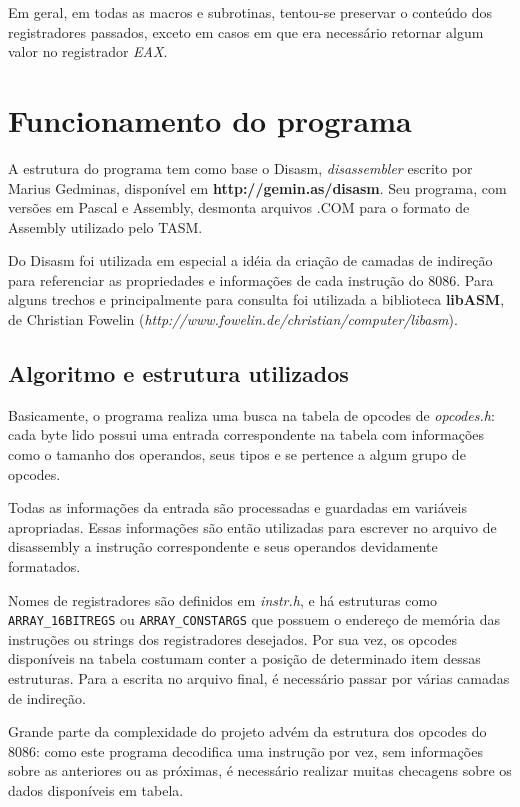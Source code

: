 \documentclass{article}
\begin{document}
Em geral, em todas as macros e subrotinas, tentou-se preservar o conteúdo dos registradores passados, exceto em casos em que era necessário retornar algum valor no registrador \textit{EAX}.


\section{Funcionamento do programa}
A estrutura do programa tem como base o Disasm, \textit{disassembler} escrito por Marius Gedminas, disponível em \textbf{http://gemin.as/disasm}. Seu programa, com versões em Pascal e Assembly, desmonta arquivos .COM para o formato de Assembly utilizado pelo TASM.

Do Disasm foi utilizada em especial a idéia da criação de camadas de indireção para referenciar as propriedades e informações de cada instrução do 8086. Para alguns trechos e principalmente para consulta foi utilizada a biblioteca \textbf{libASM}, de Christian Fowelin (\textit{http://www.fowelin.de/christian/computer/libasm}).

\subsection{Algoritmo e estrutura utilizados}
Basicamente, o programa realiza uma busca na tabela de opcodes de \textit{opcodes.h}: cada byte lido possui uma entrada correspondente na tabela com informações como o tamanho dos operandos, seus tipos e se pertence a algum grupo de opcodes.

Todas as informações da entrada são processadas e guardadas em variáveis apropriadas. Essas informações são então utilizadas para escrever no arquivo de disassembly a instrução correspondente e seus operandos devidamente formatados.

Nomes de registradores são definidos em \textit{instr.h}, e há estruturas como \texttt{ARRAY\_16BITREGS} ou \texttt{ARRAY\_CONSTARGS} que possuem o endereço de memória das instruções ou strings dos registradores desejados. Por sua vez, os opcodes disponíveis na tabela costumam conter a posição de determinado item dessas estruturas. Para a escrita no arquivo final, é necessário passar por várias camadas de indireção.

Grande parte da complexidade do projeto advém da estrutura dos opcodes do 8086: como este programa decodifica uma instrução por vez, sem informações sobre as anteriores ou as próximas, é necessário realizar muitas checagens sobre os dados disponíveis em tabela.
\end{document}
